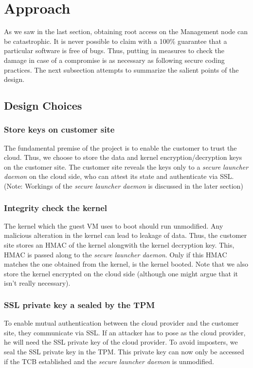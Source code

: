 \documentclass[10pt,twocolumn,pdftex]{article}
\begin{document}
\section{Approach}
\label{sec:approach}
As we saw in the last section, obtaining root access on the Management node can be catastrophic. It is never possible to claim with a 100\% guarantee that a particular software is free of bugs. Thus, putting in measures to check the damage in case of a compromise is as necessary as following secure coding practices. The next subsection attempts to summarize the salient points of the design. 

\subsection{Design Choices}

\subsubsection{Store keys on customer site}
The fundamental premise of the project is to enable the customer to trust the cloud. Thus, we choose to store the data and kernel encryption/decryption keys on the customer site. The customer site reveals the keys only to a \emph{secure launcher daemon} on the cloud side, who can attest its state and authenticate via SSL. (Note: Workings of the \emph{secure launcher daemon} is discussed in the later section)

\subsubsection{Integrity check the kernel}
The kernel which the guest VM uses to boot should run unmodified. Any malicious alteration in the kernel can lead to leakage of data. Thus, the customer site stores an HMAC of the kernel alongwith the kernel decryption key. This, HMAC is passed along to the \emph{secure launcher daemon}. Only if this HMAC matches the one obtained from the kernel, is the kernel booted. Note that we also store the kernel encrypted on the cloud side (although one might argue that it isn't really necessary).

\subsubsection{SSL private key a sealed by the TPM}
To enable mutual authentication between the cloud provider and the customer site, they communicate via SSL. If an attacker has to pose as the cloud provider, he will need the SSL private key of the cloud provider. To avoid imposters, we seal the SSL private key in the TPM. This private key can now only be accessed if the TCB established and the \emph{secure launcher daemon} is unmodified.
\end{document}
